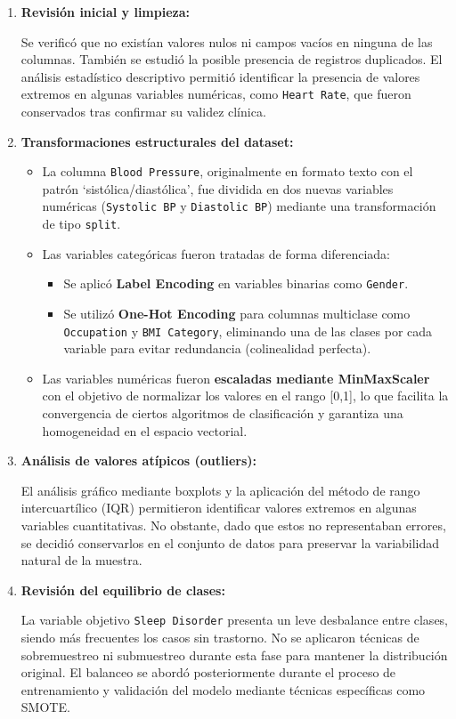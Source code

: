 \begin{enumerate}
    \item \textbf{Revisión inicial y limpieza:}

 Se verificó que no existían valores nulos ni campos vacíos en ninguna de las columnas. También se estudió la posible presencia de registros duplicados. El análisis estadístico descriptivo permitió identificar la presencia de valores extremos en algunas variables numéricas, como \verb|Heart Rate|, que fueron conservados tras confirmar su validez  clínica.
    \item \textbf{Transformaciones estructurales del dataset:}
    \begin{itemize}
        \item La columna \verb|Blood Pressure|, originalmente en formato texto con el patrón `sistólica/diastólica', fue dividida en dos nuevas variables numéricas (\verb|Systolic BP| y \verb|Diastolic BP|) mediante una transformación de tipo \verb|split|.
        \item Las variables categóricas fueron tratadas de forma diferenciada:
        \begin{itemize}
            \item Se aplicó \textbf{Label Encoding} en variables binarias como \verb|Gender|.
            \item Se utilizó \textbf{One-Hot Encoding} para columnas multiclase como \verb|Occupation| y \verb|BMI Category|, eliminando una de las clases por cada variable para evitar redundancia (colinealidad perfecta).
        \end{itemize}
        \item Las variables numéricas fueron \textbf{escaladas mediante MinMaxScaler} con el objetivo de normalizar los valores en el rango [0,1], lo que facilita la convergencia de ciertos algoritmos de clasificación y garantiza una homogeneidad en el espacio vectorial.
    \end{itemize}
    \item \textbf{Análisis de valores atípicos (outliers):}

 El análisis gráfico mediante boxplots y la aplicación del método de rango intercuartílico (IQR) permitieron identificar valores extremos en algunas variables cuantitativas. No obstante, dado que estos no representaban errores, se decidió conservarlos en el conjunto de datos para preservar la variabilidad natural de la muestra.
    \item \textbf{Revisión del equilibrio de clases:}

 La variable objetivo \verb|Sleep Disorder| presenta un leve desbalance entre clases, siendo más frecuentes los casos sin trastorno. No se aplicaron técnicas de sobremuestreo ni submuestreo durante esta fase para mantener la distribución original. El balanceo se abordó posteriormente durante el proceso de entrenamiento y validación del modelo mediante técnicas específicas como SMOTE.
\end{enumerate}


